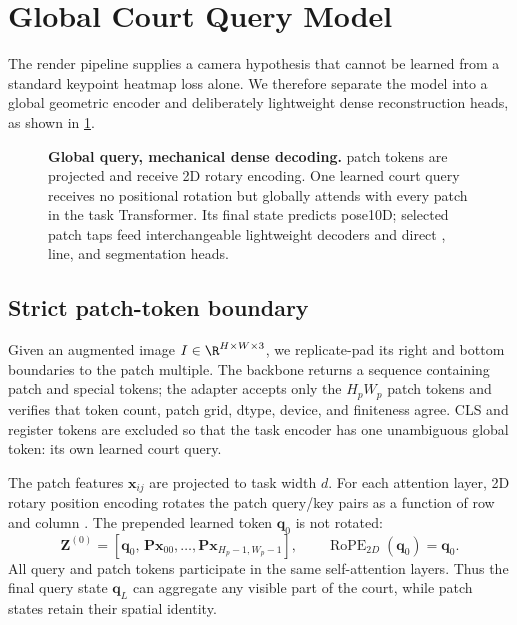 \section{Global Court Query Model}
\label{sec:model}

The render pipeline supplies a camera hypothesis that cannot be learned from a
standard keypoint heatmap loss alone.  We therefore separate the model into a
global geometric encoder and deliberately lightweight dense reconstruction
heads, as shown in \cref{fig:model}.

\begin{figure}[t]
  \centering
  \resizebox{\linewidth}{!}{}
  \caption{\textbf{Global query, mechanical dense decoding.}  \DINO{} patch
  tokens are projected and receive 2D rotary encoding.  One learned court query
  receives no positional rotation but globally attends with every patch in the
  task Transformer.  Its final state predicts pose10D; selected patch taps feed
  interchangeable lightweight decoders and direct \KP, line, and segmentation
  heads.}
  \label{fig:model}
\end{figure}

\subsection{Strict patch-token boundary}

Given an augmented image \(I\in\R^{H\times W\times 3}\), we replicate-pad its
right and bottom boundaries to the \DINO{} patch multiple.  The backbone
returns a sequence containing patch and special tokens; the adapter accepts
only the \(H_pW_p\) patch tokens and verifies that token count, patch grid,
dtype, device, and finiteness agree.  CLS and register tokens are excluded so
that the task encoder has one unambiguous global token: its own learned court
query.

The patch features \(\mathbf{x}_{ij}\) are projected to task width \(d\).  For
each attention layer, 2D rotary position encoding rotates the patch query/key
pairs as a function of row and column \citep{su2021roformer}.  The prepended
learned token \(\mathbf{q}_0\) is not rotated:
\begin{equation}
  \mathbf{Z}^{(0)}=
  [\mathbf{q}_0,\,\mathbf{P}\mathbf{x}_{00},\ldots,
   \mathbf{P}\mathbf{x}_{H_p-1,W_p-1}],
  \qquad
  \operatorname{RoPE}_{2D}(\mathbf{q}_0)=\mathbf{q}_0.
  \label{eq:query_input}
\end{equation}
All query and patch tokens participate in the same self-attention layers.
Thus the final query state \(\mathbf{q}_L\) can aggregate any visible part of
the court, while patch states retain their spatial identity.

